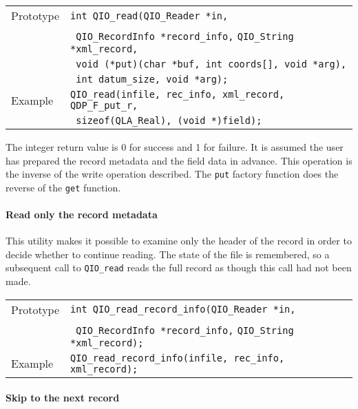 \documentclass{article}
\newcommand{\QIOstring}{{\tt QIO\_String }}
\begin{document}
\begin{flushleft}
  \begin{tabular}{|l|l|}
  \hline
  Prototype      & \verb|int QIO_read(QIO_Reader *in,| \\
            & \verb| QIO_RecordInfo *record_info,| \QIOstring \verb|*xml_record, |\\
	    & \verb| void (*put)(char *buf, int coords[], void *arg), |\\
            & \verb| int datum_size, void *arg);| \\
\hline
  Example  & \verb|QIO_read(infile, rec_info, xml_record, QDP_F_put_r, |\\
           & \verb| sizeof(QLA_Real), (void *)field);|\\
   \hline
 \end{tabular}
\end{flushleft}
%
The integer return value is 0 for success and 1 for failure.  It is
assumed the user has prepared the record metadata and the field data
in advance.  This operation is the inverse of the write operation
described.  The \verb|put| factory function does the reverse of the
\verb|get| function.

\paragraph{Read only the record metadata}

This utility makes it possible to examine only the header of the
record in order to decide whether to continue reading.  The state of
the file is remembered, so a subsequent call to \verb|QIO_read| reads
the full record as though this call had not been made.
%
\begin{flushleft}
  \begin{tabular}{|l|l|}
  \hline
  Prototype      & \verb|int QIO_read_record_info(QIO_Reader *in,| \\
                 & \verb| QIO_RecordInfo *record_info,| \QIOstring \verb|*xml_record);| \\
\hline
  Example  & \verb|QIO_read_record_info(infile, rec_info, xml_record);|\\
   \hline
 \end{tabular}
\end{flushleft}
%

\paragraph{Skip to the next record}
\end{document}
